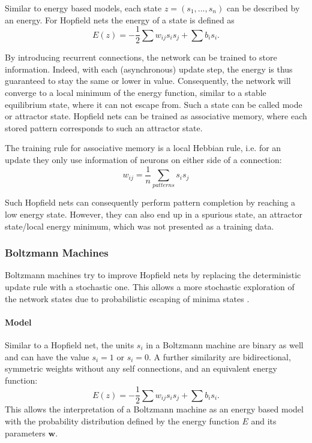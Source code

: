 Similar to energy based models, each state $z = (s_1, ... , s_n)$ can be described by an energy. 
For Hopfield nets the energy of a state is defined as  
\[
E(z) = - \frac{1}{2} \sum w_{ij} s_i s_j + \sum b_i s_i .
\]


By introducing recurrent connections, the network can be trained to store information.
Indeed, with each (asynchronous) update step, the energy is thus guaranteed to stay the same or lower in value.
Consequently, the network will converge to a local minimum of the energy function, similar to a stable equilibrium state, where it can not escape from. 
Such a state can be called mode or attractor state.
Hopfield nets can be trained as associative memory, where each stored pattern corresponds to such an attractor state.

The training rule for associative memory is a local Hebbian rule, i.e. for an update they only use information of neurons on either side of a connection:
\[
w_{ij} = \frac{1}{n} \sum_{patterns} s_{i} s_{j}
\]

Such Hopfield nets can consequently perform pattern completion by reaching a low energy state.
However, they can also end up in a spurious state, an attractor state/local energy minimum, which was not presented as a training data.


\subsubsection{Boltzmann Machines} \label{c:bms}

Boltzmann machines try to improve Hopfield nets by replacing the deterministic update rule with a stochastic one.
This allows a more stochastic exploration of the network states due to probabilistic escaping of minima states \cite{ackley1985learning} \cite{Goodfellow-et-al-2016-Book}.

\paragraph{Model} \label{c:bmmodel}

Similar to a Hopfield net, the units $s_i$ in a Boltzmann machine are binary as well and can have the value $s_i = 1$ or $s_i = 0$. 
A further similarity are bidirectional, symmetric weights without any self connections, and an equivalent energy function:
\[
	E(z) = - \frac{1}{2} \sum w_{ij} s_i s_j + \sum b_i s_i .
\]
This allows the interpretation of a Boltzmann machine as an energy based model with the probability distribution defined by the energy function $E$ and its parameters $\textbf{w}$.

